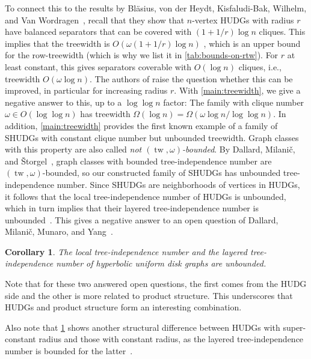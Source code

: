\documentclass[11pt]{article}
\newtheorem{corollary}[theorem]{Corollary}
\providecommand{\todo}[2][]{}
\DeclareMathOperator{\tw}{tw}
\begin{document}
%
To connect this to the results by Bläsius, von der Heydt, Kisfaludi-Bak, Wilhelm, and Van Wordragen~\cite{Struc_Indep_Hyper_Unifor_Disk_Graph-Blaesius25}, recall that they show that $ n $-vertex HUDGs with radius $ r $ have balanced separators that can be covered with $ (1 + 1/r) \log n $ cliques.
This implies that the treewidth is $ O(\omega (1 + 1/r) \log n) $ \cite{Treew_Graph_Balan_Separ-DvoraNorin19}, which is an upper bound for the row-treewidth (which is why we list it in \cref{tab:bounds-on-rtw}).
For $r$ at least constant, this gives separators coverable with $O(\log n)$ cliques, i.e., treewidth $ O(\omega \log n) $. 
The authors of \cite{Struc_Indep_Hyper_Unifor_Disk_Graph-Blaesius25} raise the question whether this can be improved, in particular for increasing radius $r$.
With \cref{main:treewidth}, we give a negative answer to this, up to a $\log\log n$ factor: The family with clique number $\omega \in O(\log\log n)$ has treewidth $\Omega(\log n) = \Omega(\omega \log n / \log\log n)$.
%
In addition, \cref{main:treewidth} provides the first known example of a family of SHUDGs with constant clique number but unbounded treewidth.
Graph classes with this property are also called \emph{not $ (\tw, \omega) $-bounded}.
%
By Dallard, Milanič, and Štorgel~\cite{dallard_tree-alpha_2024}, graph classes with bounded tree-independence number are $ (\tw, \omega) $-bounded, so our constructed family of SHUDGs has unbounded tree-independence number.
Since SHUDGs are neighborhoods of vertices in HUDGs, it follows that the local tree-independence number of HUDGs is unbounded, which in turn implies that their layered tree-independence number is unbounded~\cite{galby_local-tree-alpha_2024}.
This gives a negative answer to an open question of Dallard, Milanič, Munaro, and Yang~\cite{dallard_layered-tree-alpha_2025}.
%
\begin{corollary}\label{cor:tree-alpha}
    The local tree-independence number and the layered tree-independence number of hyperbolic uniform disk graphs are unbounded.
\end{corollary}
%
Note that for these two answered open questions, the first comes from the HUDG side and the other is more related to product structure.
This underscores that HUDGs and product structure form an interesting combination.
%
\todo{I really dislike to have the last sentence at this position. Any better suggestions?}
Also note that \cref{cor:tree-alpha} shows another structural difference between HUDGs with super-constant radius and those with constant radius, as the layered tree-independence number is bounded for the latter~\cite{dallard_layered-tree-alpha_2025}.
%
%
% 
%
%
%
%
%
%
%
\end{document}
